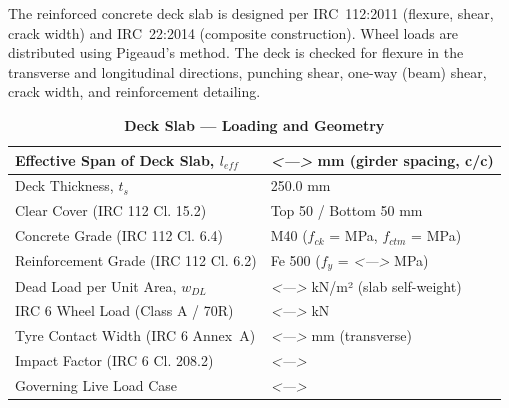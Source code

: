 \documentclass[12pt,a4paper]{report}
\numberwithin{table}{chapter}
\numberwithin{figure}{chapter}
\newcommand{\placeholder}[1]{\textit{\textless #1\textgreater}}
\begin{document}
The reinforced concrete deck slab is designed per IRC~112:2011 (flexure, shear, crack width) and IRC~22:2014 (composite construction). Wheel loads are distributed using Pigeaud's method. The deck is checked for flexure in the transverse and longitudinal directions, punching shear, one-way (beam) shear, crack width, and reinforcement detailing.

\vspace{1em}
\begin{longtable}{|L{5.5cm}|p{10.0cm}|}
\caption{\textbf{Deck Slab --- Loading and Geometry}}
\hline
\textnormal{Effective Span of Deck Slab, $l_{eff}$} & \placeholder{---} mm (girder spacing, c/c) \\[6pt]
\hline
\textnormal{Deck Thickness, $t_s$} & 250.0 mm \\[6pt]
\hline
\textnormal{Clear Cover (IRC 112 Cl. 15.2)} & Top 50 / Bottom 50 mm \\[6pt]
\hline
\textnormal{Concrete Grade (IRC 112 Cl. 6.4)} & M40 ($f_{ck}$ =  MPa, $f_{ctm}$ =  MPa) \\[6pt]
\hline
\textnormal{Reinforcement Grade (IRC 112 Cl. 6.2)} & Fe 500 ($f_y$ = \placeholder{---} MPa) \\[6pt]
\hline
\textnormal{Dead Load per Unit Area, $w_{DL}$} & \placeholder{---} kN/m² (slab self-weight) \\[6pt]
\hline
\textnormal{IRC 6 Wheel Load (Class A / 70R)} & \placeholder{---} kN \\[6pt]
\hline
\textnormal{Tyre Contact Width (IRC 6 Annex~A)} & \placeholder{---} mm (transverse) \\[6pt]
\hline
\textnormal{Impact Factor (IRC 6 Cl. 208.2)} & \placeholder{---} \\[6pt]
\hline
\textnormal{Governing Live Load Case} & \placeholder{---} \\[6pt]
\hline
\end{longtable}
\end{document}
